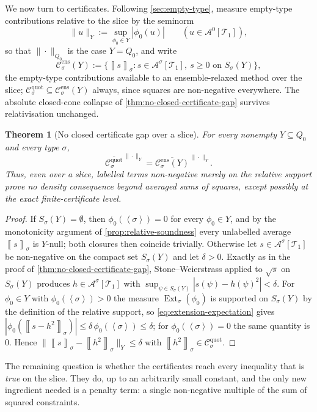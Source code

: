 \documentclass[11pt]{article}
\newtheorem{theorem}{Theorem}
\theoremstyle{definition}
\newcommand{\A}{\mathcal{A}}
\newcommand{\T}{\mathcal{T}}
\newcommand{\C}{\mathcal{C}}
\newcommand{\Ext}{\operatorname{Ext}}
\newcommand{\brak}[1]{\left\langle #1\right\rangle}
\newcommand{\avg}[2]{\left\llbracket #1 \right\rrbracket_{#2}}
\begin{document}
We now turn to certificates.  Following \cref{sec:empty-type}, measure empty-type
contributions relative to the slice by the seminorm
\[
  \|u\|_{Y}:=\sup_{\phi_0\in Y}|\phi_0(u)|
  \qquad(u\in\A^0[\T_1]),
\]
so that $\|\cdot\|_{Q_0}$ is the case $Y=Q_0$, and write
\[
  \C^{\mathrm{ens}}_\sigma(Y):=\{\avg{s}{\sigma}:s\in\A^\sigma[\T_1],\
  s\ge0\text{ on }S_\sigma(Y)\},
\]
the empty-type contributions available to an ensemble-relaxed method over the slice;
$\C^{\mathrm{quot}}_\sigma\subseteq\C^{\mathrm{ens}}_\sigma(Y)$ always, since squares
are non-negative everywhere.  The absolute closed-cone collapse of
\cref{thm:no-closed-certificate-gap} survives relativisation unchanged.

\begin{theorem}[No closed certificate gap over a slice]\label{thm:relative-certificate-gap}
For every nonempty $Y\subseteq Q_0$ and every type $\sigma$,
\[
  \overline{\C^{\mathrm{quot}}_\sigma}^{\,\|\cdot\|_{Y}}
  =
  \overline{\C^{\mathrm{ens}}_\sigma(Y)}^{\,\|\cdot\|_{Y}} .
\]
Thus, even over a slice, labelled terms non-negative merely on the relative support prove
no density consequence beyond averaged sums of squares, except possibly at the exact
finite-certificate level.
\end{theorem}

\begin{proof}
If $S_\sigma(Y)=\emptyset$, then $\phi_0(\brak\sigma)=0$ for every $\phi_0\in Y$, and
by the monotonicity argument of \cref{prop:relative-soundness} every unlabelled average
$\avg{s}{\sigma}$ is $Y$-null; both closures then coincide trivially.  Otherwise let
$s\in\A^\sigma[\T_1]$ be non-negative on the compact set $S_\sigma(Y)$ and let
$\delta>0$.  Exactly as in the proof of \cref{thm:no-closed-certificate-gap},
Stone--Weierstrass applied to $\sqrt{s}$ on $S_\sigma(Y)$ produces
$h\in\A^\sigma[\T_1]$ with $\sup_{\psi\in S_\sigma(Y)}|s(\psi)-h(\psi)^2|<\delta$.  For
$\phi_0\in Y$ with $\phi_0(\brak\sigma)>0$ the measure $\Ext_\sigma(\phi_0)$ is
supported on $S_\sigma(Y)$ by the definition of the relative support, so
\eqref{eq:extension-expectation} gives
$|\phi_0(\avg{s-h^2}{\sigma})|\le\delta\,\phi_0(\brak\sigma)\le\delta$; for
$\phi_0(\brak\sigma)=0$ the same quantity is $0$.  Hence
$\|\avg{s}{\sigma}-\avg{h^2}{\sigma}\|_{Y}\le\delta$ with
$\avg{h^2}{\sigma}\in\C^{\mathrm{quot}}_\sigma$.
\end{proof}

The remaining question is whether the certificates reach every inequality that is
\emph{true} on the slice.  They do, up to an arbitrarily small constant, and the only
new ingredient needed is a penalty term: a single non-negative multiple of the sum of
squared constraints.
\end{document}
